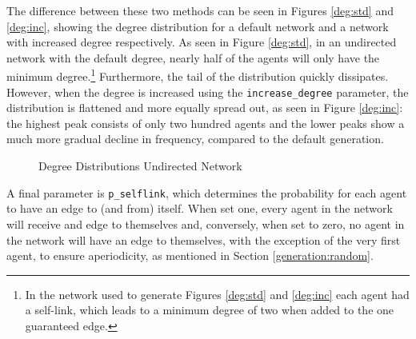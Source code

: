 \documentclass[a4paper, 12pt]{report}
\begin{document}
\noindent The difference between these two methods can be seen in Figures \ref{deg:std} and \ref{deg:inc}, showing the degree distribution for a default network and a network with increased degree respectively. As seen in Figure \ref{deg:std}, in an undirected network with the default degree, nearly half of the agents will only have the minimum degree.\footnote{In the network used to generate Figures \ref{deg:std} and \ref{deg:inc} each agent had a self-link, which leads to a minimum degree of two when added to the one guaranteed edge.} Furthermore, the tail of the distribution quickly dissipates. However, when the degree is increased using the \texttt{increase\_degree} parameter, the distribution is flattened and more equally spread out, as seen in Figure \ref{deg:inc}: the highest peak consists of only two hundred agents and the lower peaks show a much more gradual decline in frequency, compared to the default generation.
\begin{figure}[!htbp]
  \centering
  \hfill
  \caption{Degree Distributions Undirected Network}
\end{figure}

\noindent A final parameter is \texttt{p\_selflink}, which determines the probability for each agent to have an edge to (and from) itself. When set one, every agent in the network will receive and edge to themselves and, conversely, when set to zero, no agent in the network will have an edge to themselves, with the exception of the very first agent, to ensure aperiodicity, as mentioned in Section \ref{generation:random}.
\end{document}
